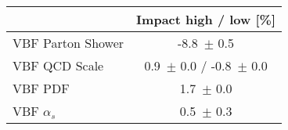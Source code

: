 \begin{tabular}{ | l || c |}
\hline
 & Impact high / low [\%]  \tabularnewline
\hline
VBF Parton Shower& -8.8\, $\pm$  0.5\tabularnewline
VBF QCD Scale & 0.9\, $\pm$ 0.0 / -0.8\, $\pm$ 0.0 \tabularnewline
VBF PDF & 1.7\, $\pm$  0.0 \tabularnewline
VBF $\alpha_s$ & 0.5\, $\pm$  0.3 \tabularnewline
\hline
\end{tabular}

